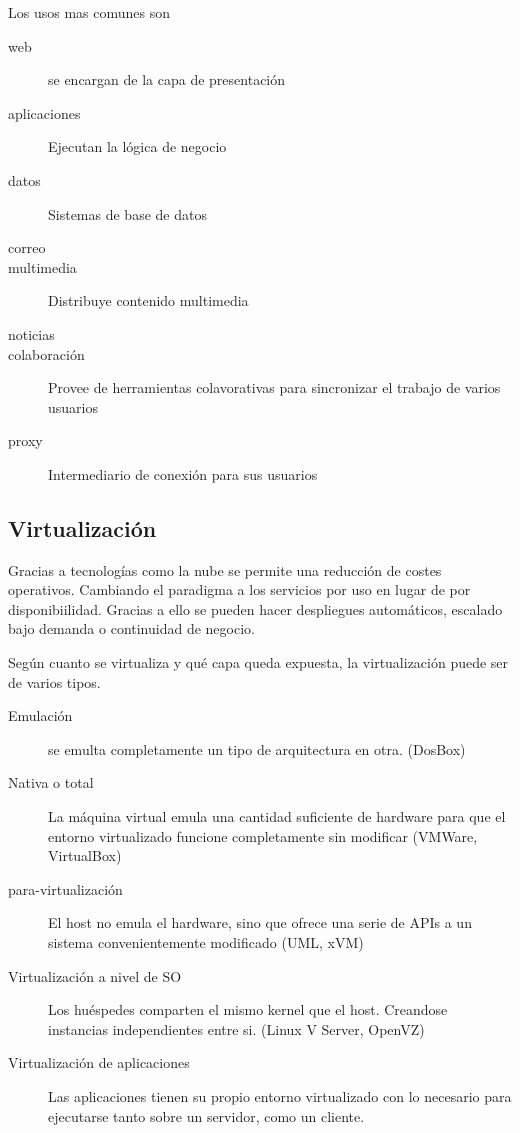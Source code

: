     Los usos mas comunes son
    \begin{description}
        \item[web] se encargan de la capa de presentación
        \item[aplicaciones] Ejecutan la lógica de negocio
        \item[datos] Sistemas de base de datos
        \item[correo]
        \item[multimedia] Distribuye contenido multimedia
        \item[noticias]
        \item[colaboración] Provee de herramientas colavorativas para sincronizar el trabajo de varios usuarios
        \item[proxy] Intermediario de conexión para sus usuarios
    \end{description}

\subsection{Virtualización}
    Gracias a tecnologías como la nube se permite una reducción de costes operativos. Cambiando el paradigma a los servicios por uso en lugar de por disponibiilidad. Gracias a ello se pueden hacer despliegues automáticos, escalado bajo demanda o continuidad de negocio.

    Según cuanto se virtualiza y qué capa queda expuesta, la virtualización puede ser de varios tipos.
    \begin{description}
        \item[Emulación] se emulta completamente un tipo de arquitectura en otra. (DosBox)
        \item[Nativa o total] La máquina virtual emula una cantidad suficiente de hardware para que el entorno virtualizado funcione completamente sin modificar (VMWare, VirtualBox)
        \item[para-virtualización] El host no emula el hardware, sino que ofrece una serie de APIs a un sistema convenientemente modificado (UML, xVM)
        \item[Virtualización a nivel de SO] Los huéspedes comparten el mismo kernel que el host. Creandose instancias independientes entre si. (Linux V Server, OpenVZ)
        \item[Virtualización de aplicaciones] Las aplicaciones tienen su propio entorno virtualizado con lo necesario para ejecutarse tanto sobre un servidor, como un cliente.
    \end{description}

